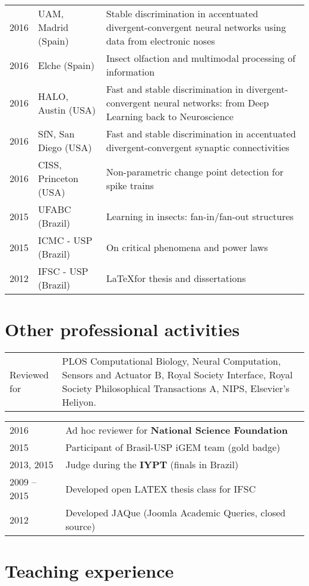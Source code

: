 \documentclass[letter,10pt]{article} %
\begin{document}
\begin{longtable}{p{1cm}p{3.3cm}p{12cm}}
  2016  & UAM, Madrid (Spain) & Stable discrimination in accentuated divergent-convergent neural networks using data from electronic noses
 \\
 2016  & Elche (Spain) & Insect olfaction and multimodal processing of information
 \\
  2016  & HALO, Austin (USA) & Fast and stable discrimination in divergent-convergent neural networks: from Deep Learning back to Neuroscience
  \\
  2016  & SfN, San Diego (USA) & Fast and stable discrimination in accentuated divergent-convergent synaptic connectivities \\
  2016  & CISS, Princeton (USA) & Non-parametric change point detection for spike trains \\
  2015  & UFABC (Brazil) &  Learning in insects: fan-in/fan-out structures  \\
  2015  & ICMC - USP (Brazil) &  On critical phenomena and power laws  \\
  2012  & IFSC - USP (Brazil) &  \LaTeX for thesis and dissertations  \\
\end{longtable}


\section{Other professional activities}

\begin{longtable}{p{2.5cm}p{14cm}}
  Reviewed for & PLOS Computational Biology, Neural Computation,
  Sensors and Actuator B, Royal Society Interface, Royal Society
  Philosophical Transactions A, NIPS, Elsevier's Heliyon.
\end{longtable}

\begin{longtable}{p{2.5cm}p{15cm}}
  2016 & Ad hoc reviewer for {\bf National Science Foundation} \\
  2015 & Participant of Brasil-USP iGEM team (gold badge)\\
  2013, 2015  & Judge during the {\bf IYPT} (finals in Brazil) \\
  2009 -- 2015 & Developed open LATEX thesis class for IFSC \\
  2012 & Developed JAQue (Joomla Academic Queries, closed source)
\end{longtable}


\section{Teaching experience}
\end{document}
